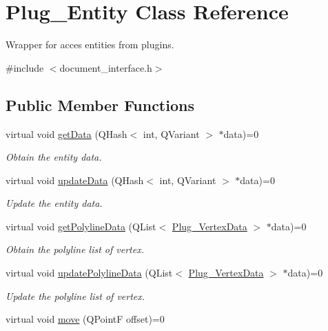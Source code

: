 \hypertarget{classPlug__Entity}{\section{Plug\-\_\-\-Entity Class Reference}
\label{classPlug__Entity}
}


Wrapper for acces entities from plugins.  




{\ttfamily \#include $<$document\-\_\-interface.\-h$>$}

\subsection*{Public Member Functions}
\begin{DoxyCompactItemize}
\item 
virtual void \hyperlink{classPlug__Entity_a3e2acf80beecc81e0e7596bf782b869a}{get\-Data} (Q\-Hash$<$ int, Q\-Variant $>$ $\ast$data)=0
\begin{DoxyCompactList}\small\item\em Obtain the entity data. \end{DoxyCompactList}\item 
virtual void \hyperlink{classPlug__Entity_a54501af73a74d97116cfac8b145049ca}{update\-Data} (Q\-Hash$<$ int, Q\-Variant $>$ $\ast$data)=0
\begin{DoxyCompactList}\small\item\em Update the entity data. \end{DoxyCompactList}\item 
virtual void \hyperlink{classPlug__Entity_a35882191753a8945aba9034265dd4a37}{get\-Polyline\-Data} (Q\-List$<$ \hyperlink{classPlug__VertexData}{Plug\-\_\-\-Vertex\-Data} $>$ $\ast$data)=0
\begin{DoxyCompactList}\small\item\em Obtain the polyline list of vertex. \end{DoxyCompactList}\item 
virtual void \hyperlink{classPlug__Entity_a2b427ad5ac34d6a9d408d5e9e48ac93c}{update\-Polyline\-Data} (Q\-List$<$ \hyperlink{classPlug__VertexData}{Plug\-\_\-\-Vertex\-Data} $>$ $\ast$data)=0
\begin{DoxyCompactList}\small\item\em Update the polyline list of vertex. \end{DoxyCompactList}\item 
virtual void \hyperlink{classPlug__Entity_a83b1ec84b81854d4fb8099d95930397b}{move} (Q\-Point\-F offset)=0

\end{DoxyCompactItemize}
